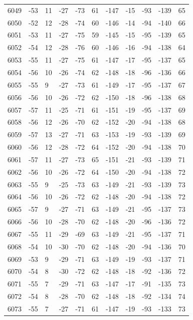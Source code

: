 \begin{table}[H]
\begin{tabular}{lllllllllll}
6049 & -53 & 11 & -27 & -73 & 61 & -147 & -15 & -93 & -139 & 65 \\
6050 & -52 & 12 & -28 & -74 & 60 & -146 & -14 & -94 & -140 & 66 \\
6051 & -53 & 11 & -27 & -75 & 59 & -145 & -15 & -95 & -139 & 65 \\
6052 & -54 & 12 & -28 & -76 & 60 & -146 & -16 & -94 & -138 & 64 \\
6053 & -55 & 11 & -27 & -75 & 61 & -147 & -17 & -95 & -137 & 65 \\
6054 & -56 & 10 & -26 & -74 & 62 & -148 & -18 & -96 & -136 & 66 \\
6055 & -55 & 9 & -27 & -73 & 61 & -149 & -17 & -95 & -137 & 67 \\
6056 & -56 & 10 & -26 & -72 & 62 & -150 & -18 & -96 & -138 & 68 \\
6057 & -57 & 11 & -25 & -71 & 61 & -151 & -19 & -95 & -137 & 69 \\
6058 & -56 & 12 & -26 & -70 & 62 & -152 & -20 & -94 & -138 & 68 \\
6059 & -57 & 13 & -27 & -71 & 63 & -153 & -19 & -93 & -139 & 69 \\
6060 & -56 & 12 & -28 & -72 & 64 & -152 & -20 & -94 & -138 & 70 \\
6061 & -57 & 11 & -27 & -73 & 65 & -151 & -21 & -93 & -139 & 71 \\
6062 & -56 & 10 & -26 & -72 & 64 & -150 & -20 & -94 & -138 & 72 \\
6063 & -55 & 9 & -25 & -73 & 63 & -149 & -21 & -93 & -139 & 73 \\
6064 & -56 & 10 & -26 & -72 & 62 & -148 & -20 & -94 & -138 & 72 \\
6065 & -57 & 9 & -27 & -71 & 63 & -149 & -21 & -95 & -137 & 73 \\
6066 & -56 & 10 & -28 & -70 & 62 & -148 & -20 & -96 & -136 & 72 \\
6067 & -55 & 11 & -29 & -69 & 63 & -149 & -21 & -95 & -137 & 71 \\
6068 & -54 & 10 & -30 & -70 & 62 & -148 & -20 & -94 & -136 & 70 \\
6069 & -53 & 9 & -29 & -71 & 63 & -149 & -19 & -93 & -137 & 71 \\
6070 & -54 & 8 & -30 & -72 & 62 & -148 & -18 & -92 & -136 & 72 \\
6071 & -55 & 7 & -29 & -71 & 63 & -147 & -17 & -91 & -135 & 73 \\
6072 & -54 & 8 & -28 & -70 & 62 & -148 & -18 & -92 & -134 & 74 \\
6073 & -55 & 7 & -27 & -71 & 61 & -147 & -19 & -93 & -133 & 73 \\

\end{tabular}
\end{table}
